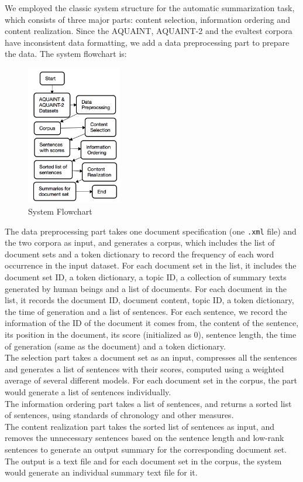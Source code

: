 \documentclass[11pt]{article}
\begin{document}
We employed the classic system structure for the automatic summarization task, which consists of three major parts: content selection, information ordering and content realization. Since the AQUAINT, AQUAINT-2 and the evaltest corpora have inconsistent data formatting, we add a data preprocessing part to prepare the data. The system flowchart is: \\
\begin{figure}[h]
\begin{center}
\includegraphics[width=0.37\textwidth]{flowchart.png}
\caption{System Flowchart}
\end{center}
\end{figure}
\indent
The data preprocessing part takes one document specification (one \texttt{.xml} file) and the two corpora as input, and generates a corpus, which includes the list of document sets and a token dictionary to record the frequency of each word occurrence in the input dataset. For each document set in the list, it includes the document set ID, a token dictionary, a topic ID, a collection of summary texts generated by human beings and a list of documents. For each document in the list, it records the document ID, document content, topic ID, a token dictionary, the time of generation and a list of sentences. For each sentence, we record the information of the ID of the document it comes from, the content of the sentence, its position in the document, its score (initialized as 0), sentence length, the time of generation (same as the document) and a token dictionary.\\
\indent
The selection part takes a document set as an input, compresses all the sentences and generates a list of sentences with their scores, computed using a weighted average of several different models. For each document set in the corpus, the part would generate a list of sentences individually.\\
\indent
The information ordering part takes a list of sentences, and returns a sorted list of sentences, using standards of chronology and other measures. \\
\indent
The content realization part takes the sorted list of sentences as input, and removes the unnecessary sentences based on the sentence length and low-rank sentences to generate an output summary for the corresponding document set. The output is a text file and for each document set in the corpus, the system would generate an individual summary text file for it.
\end{document}
